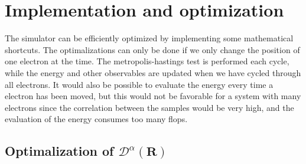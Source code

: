 \documentclass[a4paper,10pt,twocolumn]{article} %
\newcommand{\ts}[1]{\textbf{#1}}
\begin{document}
%
%
%
%
%
%
%



\section{Implementation and optimization}%

The simulator can be efficiently optimized by implementing some mathematical shortcuts. The optimalizations can only be done if we only change the position of one electron at the time.
The metropolis-hastings test is performed each cycle, while the energy and other observables are updated when we have cycled through all electrons. It would also be possible to
evaluate the energy every time a electron has been moved, but this would not be favorable for a system with many electrons since the correlation between the samples would be very high, 
and the evaluation of the energy consumes too many flops. 


\subsection{Optimalization of $\mathcal D^\alpha(\ts R)$} %
\end{document}
